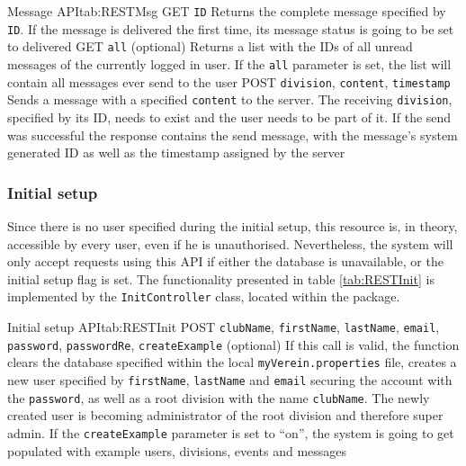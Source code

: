 \begin{RESTTable}{Message API}{tab:RESTMsg}
		{GET}
		{\texttt{ID}}
		{Returns the complete message specified by \texttt{ID}. If the message is delivered the first time, its message status is going to be set to delivered}	
		{GET}
		{\texttt{all} (optional)}
		{Returns a list with the IDs of all unread messages of the currently logged in user. If the \texttt{all} parameter is set, the list will contain all messages ever send to the user}
		{POST}
		{\texttt{division}, \texttt{content}, \texttt{timestamp}}
		{Sends a message with a specified \texttt{content} to the server. The receiving \texttt{division}, specified by its ID, needs to exist and the user needs to be part of it. If the send was successful the response contains the send message, with the message's system generated ID as well as the timestamp assigned by the server}
\end{RESTTable}

\subsubsection{Initial setup}

Since there is no user specified during the initial setup, this resource is, in theory, accessible by every user, even if he is unauthorised. Nevertheless, the system will only accept requests using this \gls{API} if either the database is unavailable, or the initial setup flag is set. The functionality presented in table \vref{tab:RESTInit} is implemented by the \texttt{InitController} class, located within the  package.

\newpage

\begin{RESTTable}{Initial setup API}{tab:RESTInit}
		{POST}
		{\texttt{clubName}, \texttt{firstName}, \texttt{lastName}, \texttt{email}, \texttt{password}, \texttt{passwordRe}, \texttt{createExample} (optional)}
		{If this call is valid, the function clears the database specified within the local \texttt{myVerein.properties} file, creates a new user specified by \texttt{firstName}, \texttt{lastName} and \texttt{email} securing the account with the \texttt{password}, as well as a root division with the name \texttt{clubName}. The newly created user is becoming administrator of the root division and therefore super admin. If the \texttt{createExample} parameter is set to \enquote{on}, the system is going to get populated with example users, divisions, events and messages}	
\end{RESTTable}

